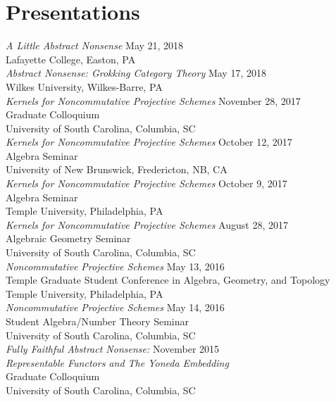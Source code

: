 \documentclass{article}
\begin{document}
\newpage
\section*{Presentations}
\noindent\textsl{A Little Abstract Nonsense} \hfill May 21, 2018\\
Lafayette College, Easton, PA\\

\noindent\textsl{Abstract Nonsense: Grokking Category Theory} \hfill May 17, 2018\\
Wilkes University, Wilkes-Barre, PA\\

\noindent\textsl{Kernels for Noncommutative Projective Schemes} \hfill November 28, 2017\\
Graduate Colloquium\\
University of South Carolina, Columbia, SC\\

\noindent\textsl{Kernels for Noncommutative Projective Schemes} \hfill October 12, 2017\\
Algebra Seminar\\
University of New Brunswick, Fredericton, NB, CA\\

\noindent\textsl{Kernels for Noncommutative Projective Schemes} \hfill October 9, 2017\\
Algebra Seminar\\
Temple University, Philadelphia, PA\\

\noindent\textsl{Kernels for Noncommutative Projective Schemes} \hfill August 28, 2017\\
Algebraic Geometry Seminar\\
University of South Carolina, Columbia, SC\\

\noindent\textsl{Noncommutative Projective Schemes} \hfill May 13, 2016\\
Temple Graduate Student Conference in Algebra, Geometry, and Topology\\
Temple University, Philadelphia, PA\\

\noindent\textsl{Noncommutative Projective Schemes} \hfill May 14, 2016\\
Student Algebra/Number Theory Seminar\\
University of South Carolina, Columbia, SC\\

\noindent\textsl{Fully Faithful Abstract Nonsense:} \hfill November 2015\\
\textsl{Representable Functors and The Yoneda Embedding}\\
Graduate Colloquium\\
University of South Carolina, Columbia, SC\\
\end{document}
